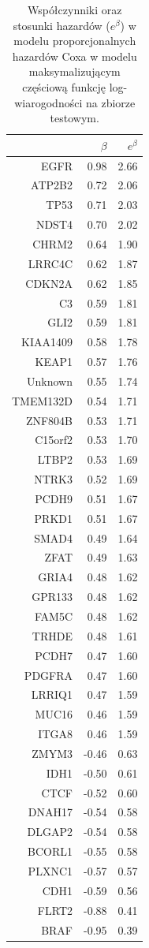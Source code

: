 \begin{table}[ht]
\centering
\begin{tabular}{rrr}
  \toprule
 & $\beta$ & $e^{\beta}$ \\ 
  \toprule
EGFR & 0.98 & 2.66 \\ 
  ATP2B2 & 0.72 & 2.06 \\ 
  TP53 & 0.71 & 2.03 \\ 
  NDST4 & 0.70 & 2.02 \\ 
  CHRM2 & 0.64 & 1.90 \\ 
  LRRC4C & 0.62 & 1.87 \\ 
  CDKN2A & 0.62 & 1.85 \\ 
  C3 & 0.59 & 1.81 \\ 
  GLI2 & 0.59 & 1.81 \\ 
  KIAA1409 & 0.58 & 1.78 \\ 
  KEAP1 & 0.57 & 1.76 \\ 
  Unknown & 0.55 & 1.74 \\ 
  TMEM132D & 0.54 & 1.71 \\ 
  ZNF804B & 0.53 & 1.71 \\ 
  C15orf2 & 0.53 & 1.70 \\ 
  LTBP2 & 0.53 & 1.69 \\ 
  NTRK3 & 0.52 & 1.69 \\ 
  PCDH9 & 0.51 & 1.67 \\ 
  PRKD1 & 0.51 & 1.67 \\ 
  SMAD4 & 0.49 & 1.64 \\ 
  ZFAT & 0.49 & 1.63 \\ 
  GRIA4 & 0.48 & 1.62 \\ 
  GPR133 & 0.48 & 1.62 \\ 
  FAM5C & 0.48 & 1.62 \\ 
  TRHDE & 0.48 & 1.61 \\ 
  PCDH7 & 0.47 & 1.60 \\ 
  PDGFRA & 0.47 & 1.60 \\ 
  LRRIQ1 & 0.47 & 1.59 \\ 
  MUC16 & 0.46 & 1.59 \\ 
  ITGA8 & 0.46 & 1.59 \\ 
  ZMYM3 & -0.46 & 0.63 \\ 
  IDH1 & -0.50 & 0.61 \\ 
  CTCF & -0.52 & 0.60 \\ 
  DNAH17 & -0.54 & 0.58 \\ 
  DLGAP2 & -0.54 & 0.58 \\ 
  BCORL1 & -0.55 & 0.58 \\ 
  PLXNC1 & -0.57 & 0.57 \\ 
  CDH1 & -0.59 & 0.56 \\ 
  FLRT2 & -0.88 & 0.41 \\ 
  BRAF & -0.95 & 0.39 \\ 
   \bottomrule
\end{tabular}
\caption{\label{tabelka}Współczynniki oraz stosunki hazardów ($e^{\beta}$) w modelu proporcjonalnych hazardów Coxa w modelu maksymalizującym częściową funkcję log-wiarogodności na zbiorze testowym. }
\end{table}
